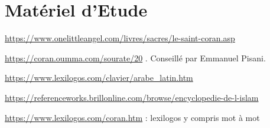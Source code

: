 \stopcontents[mainsections]
\section{Matériel d'Etude}\label{matuxe9riel}

\url{https://www.onelittleangel.com/livres/sacres/le-saint-coran.asp}

\url{https://coran.oumma.com/sourate/20} . Conseillé par Emmanuel
Pisani.

\url{https://www.lexilogos.com/clavier/arabe_latin.htm}

\url{https://referenceworks.brillonline.com/browse/encyclopedie-de-l-islam}

\url{https://www.lexilogos.com/coran.htm} : lexilogos y compris mot à
mot


